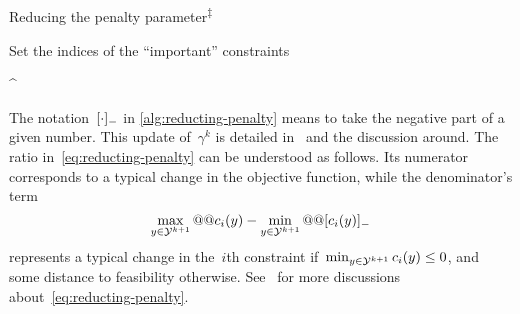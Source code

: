 \begin{algorithm}
    \caption[Reducing the penalty parameter]{Reducing the penalty parameter\textsuperscript{$\ddagger$}}
    \label{alg:reducting-penalty}
    \DontPrintSemicolon
    \onehalfspacing
    Set the indices of the \enquote{important} constraints
    \begin{algomathdisplay}
        \iub^{\ast} \eqdef {}
    \end{algomathdisplay}
\end{algorithm}
%

The notation~$[\cdot]_-$ in \cref{alg:reducting-penalty} means to take the negative part of a given number.
This update of~$\gamma^k$ is detailed in~\cite[Eq.~(12) and~(13)]{Powell_1994} and the discussion around.
The ratio in~\cref{eq:reducting-penalty} can be understood as follows.
Its numerator corresponds to a typical change in the objective function, while the denominator's term
\begin{equation*}
    \max_{y \in \xpt[k + 1]} @@ \con{i}(y) - \min_{y \in \xpt[k + 1]} @@ \negp{\con{i}(y)}
\end{equation*}
represents a typical change in the~$i$th constraint if~$\min_{y \in \xpt[k + 1]} \con{i}(y) \le 0$, and some distance to feasibility otherwise.
See~\cite[\S~4]{Powell_1994} for more discussions about~\cref{eq:reducting-penalty}.

